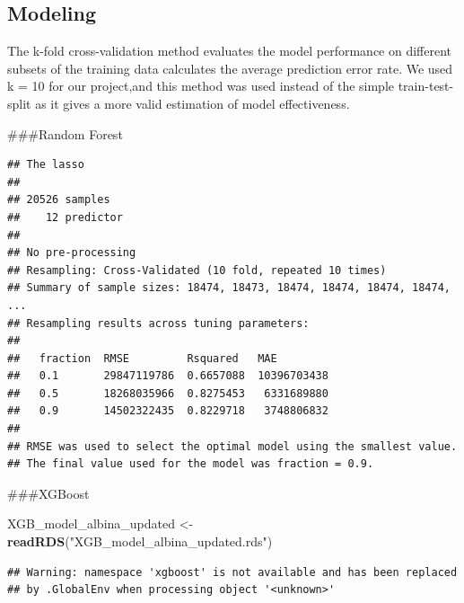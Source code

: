 \documentclass[11pt,]{article}
\newenvironment{Shaded}{\begin{snugshade}}{\end{snugshade}}
\newcommand{\KeywordTok}[1]{\textcolor[rgb]{0.13,0.29,0.53}{\textbf{#1}}}
\newcommand{\NormalTok}[1]{#1}
\newcommand{\OperatorTok}[1]{\textcolor[rgb]{0.81,0.36,0.00}{\textbf{#1}}}
\newcommand{\StringTok}[1]{\textcolor[rgb]{0.31,0.60,0.02}{#1}}
\begin{document}
\hypertarget{modeling-1}{%
\subsection{Modeling}\label{modeling-1}}

The k-fold cross-validation method evaluates the model performance on
different subsets of the training data calculates the average prediction
error rate. We used k = 10 for our project,and this method was used
instead of the simple train-test-split as it gives a more valid
estimation of model effectiveness.

\#\#\#Random Forest

\begin{Shaded}
\end{Shaded}

\begin{verbatim}
## The lasso 
## 
## 20526 samples
##    12 predictor
## 
## No pre-processing
## Resampling: Cross-Validated (10 fold, repeated 10 times) 
## Summary of sample sizes: 18474, 18473, 18474, 18474, 18474, 18474, ... 
## Resampling results across tuning parameters:
## 
##   fraction  RMSE         Rsquared   MAE        
##   0.1       29847119786  0.6657088  10396703438
##   0.5       18268035966  0.8275453   6331689880
##   0.9       14502322435  0.8229718   3748806832
## 
## RMSE was used to select the optimal model using the smallest value.
## The final value used for the model was fraction = 0.9.
\end{verbatim}

\#\#\#XGBoost

\begin{Shaded}
\begin{Highlighting}[]
\NormalTok{XGB_model_albina_updated <-}\StringTok{ }\KeywordTok{readRDS}\NormalTok{(}\StringTok{"XGB_model_albina_updated.rds"}\NormalTok{)}
\end{Highlighting}
\end{Shaded}

\begin{verbatim}
## Warning: namespace 'xgboost' is not available and has been replaced
## by .GlobalEnv when processing object '<unknown>'
\end{verbatim}
\end{document}

